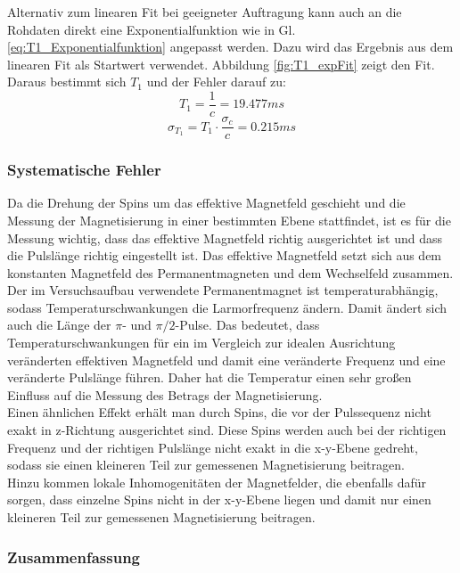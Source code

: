 \documentclass[12pt,a4paper]{article}
\begin{document}
Alternativ zum linearen Fit bei geeigneter Auftragung kann auch an die Rohdaten direkt eine Exponentialfunktion  wie in Gl. \ref{eq:T1_Exponentialfunktion} angepasst werden. Dazu wird das Ergebnis aus dem linearen Fit als Startwert verwendet. Abbildung \ref{fig:T1_expFit} zeigt den Fit. Daraus bestimmt sich $T_1$ und der Fehler darauf zu:
\begin{equation*}
T_1 = \dfrac{1}{c} = 19.477 ms
\end{equation*}
\begin{equation*}
\sigma _{T_1} = T_1 \cdot \dfrac{\sigma _c}{c} = 0.215 ms
\end{equation*}

\subsubsection{Systematische Fehler} 
Da die Drehung der Spins um das effektive Magnetfeld geschieht und die Messung der Magnetisierung in einer bestimmten Ebene stattfindet, ist es für die Messung wichtig, dass das effektive Magnetfeld richtig ausgerichtet ist und dass die Pulslänge richtig eingestellt ist. Das effektive Magnetfeld setzt sich aus dem konstanten Magnetfeld des Permanentmagneten und dem Wechselfeld zusammen. Der im Versuchsaufbau verwendete Permanentmagnet ist temperaturabhängig, sodass Temperaturschwankungen die Larmorfrequenz ändern. Damit ändert sich auch die Länge der $\pi$- und $\pi /2$-Pulse. Das bedeutet, dass Temperaturschwankungen für ein im Vergleich zur idealen Ausrichtung veränderten effektiven Magnetfeld und damit eine veränderte Frequenz und eine veränderte Pulslänge führen. Daher hat die Temperatur einen sehr großen Einfluss auf die Messung des Betrags der Magnetisierung. \\
Einen ähnlichen Effekt erhält man durch Spins, die vor der Pulssequenz nicht exakt in z-Richtung ausgerichtet sind. Diese Spins werden auch bei der richtigen Frequenz und der richtigen Pulslänge nicht exakt in die x-y-Ebene gedreht, sodass sie einen kleineren Teil zur gemessenen Magnetisierung beitragen. \\
Hinzu kommen lokale Inhomogenitäten der Magnetfelder, die ebenfalls dafür sorgen, dass einzelne Spins nicht in der x-y-Ebene liegen und damit nur einen kleineren Teil zur gemessenen Magnetisierung beitragen.

\subsubsection{Zusammenfassung}
\end{document}
